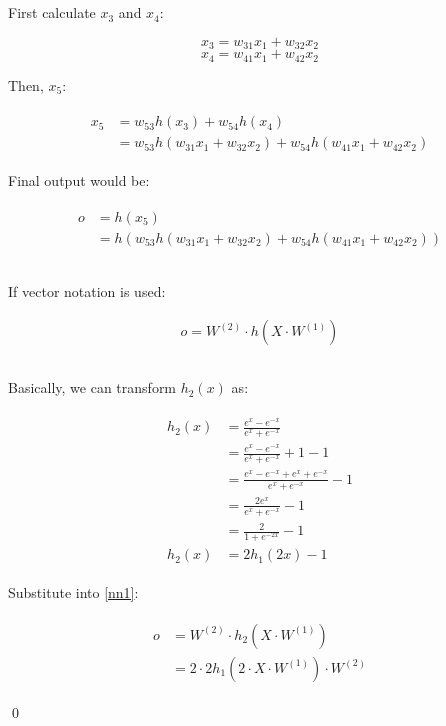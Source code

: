 \documentclass[preview]{standalone}
\begin{document}
\section{}

\subsection{}

First calculate $x_3$ and $x_4$:

\[x_3 = w_{31} x_1 + w_{32} x_2\]
\[x_4 = w_{41} x_1 + w_{42} x_2\]

Then, $x_5$:

\begin{align}
\begin{split}
x_5 &= w_{53} h(x_3) + w_{54} h(x_4)\\
    &= w_{53} h(w_{31} x_1 + w_{32} x_2) + w_{54} h(w_{41} x_1 + w_{42} x_2)
\end{split}
\end{align}

Final output would be:

\begin{align}
\begin{split}
o
&= h(x_5)\\
&= h(w_{53} h(w_{31} x_1 + w_{32} x_2) + w_{54} h(w_{41} x_1 + w_{42} x_2))
\end{split}
\end{align}

\subsection{}

If vector notation is used:

\begin{align}
    \label{nn1}
    o = W^{(2)} \cdot h(X \cdot W^{(1)})
\end{align}

\subsection{}

Basically, we can transform $h_2(x)$ as:

\begin{align}
\begin{split}
    h_2(x) &= \frac{e^x-e^{-x}}{e^x+e^{-x}}\\
           &= \frac{e^x-e^{-x}}{e^x+e^{-x}} + 1 - 1\\
           &= \frac{e^x-e^{-x} + e^x + e^{-x}}{e^x+e^{-x}} - 1\\
           &= \frac{2e^x}{e^x+e^{-x}} - 1\\
           &= \frac{2}{1+e^{-2x}} - 1\\
    h_2(x) &= 2h_1(2x)-1
\end{split}
\end{align}

Substitute into \cref{nn1}:

\begin{align}
\begin{split}
o &= W^{(2)} \cdot h_2(X \cdot W^{(1)}) \\
  &= 2 \cdot 2h_1(2 \cdot X \cdot W^{(1)}) \cdot W^{(2)}
\end{split}
\end{align}

\qed
\end{document}
